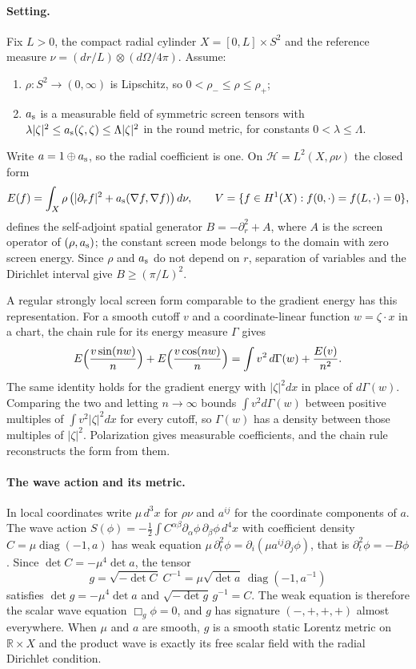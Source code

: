 \documentclass[11pt]{article}
\begin{document}
\paragraph{Setting.}
Fix $L>0$, the compact radial cylinder $X=[0,L]\times S^2$ and the reference
measure $\nu=(dr/L)\otimes(d\Omega/4\pi)$. Assume:
\begin{enumerate}\setlength{\itemsep}{1pt}
\item[(S1)] $\rho:S^2\to(0,\infty)$ is Lipschitz, so
  $0<\rho_-\leq\rho\leq\rho_+$;
\item[(S2)] $a_{\rm s}$ is a measurable field of symmetric screen tensors with
  $\lambda|\zeta|^2\leq a_{\rm s}(\zeta,\zeta)\leq\Lambda|\zeta|^2$ in the
  round metric, for constants $0<\lambda\leq\Lambda$.
\end{enumerate}
Write $a=1\oplus a_{\rm s}$, so the radial coefficient is one. On
$\mathcal H=L^2(X,\rho\nu)$ the closed form
\[
 E(f)=\int_X\rho\,\bigl(|\partial_rf|^2+a_{\rm s}(\nabla f,\nabla f)\bigr)\,d\nu,
 \qquad
 V=\{f\in H^1(X):f(0,\cdot)=f(L,\cdot)=0\},
\]
defines the self-adjoint spatial generator $B=-\partial_r^2+A$, where $A$ is
the screen operator of $(\rho,a_{\rm s})$; the constant screen mode belongs
to the domain with zero screen energy. Since $\rho$ and $a_{\rm s}$ do not
depend on $r$, separation of variables and the Dirichlet interval give
$B\geq(\pi/L)^2$.

A regular strongly local screen form comparable to the gradient energy has
this representation. For a smooth cutoff $v$ and a coordinate-linear
function $w=\zeta\cdot x$ in a chart, the chain rule for its energy measure
$\Gamma$ gives
\[
 E\Bigl(\frac{v\sin(nw)}{n}\Bigr)+E\Bigl(\frac{v\cos(nw)}{n}\Bigr)
 =\int v^2\,d\Gamma(w)+\frac{E(v)}{n^2}.
\]
The same identity holds for the gradient energy with $|\zeta|^2dx$ in place
of $d\Gamma(w)$. Comparing the two and letting $n\to\infty$ bounds
$\int v^2d\Gamma(w)$ between positive multiples of $\int v^2|\zeta|^2dx$ for
every cutoff, so $\Gamma(w)$ has a density between those multiples of
$|\zeta|^2$. Polarization gives measurable coefficients, and the chain rule
reconstructs the form from them.

\paragraph{The wave action and its metric.}
In local coordinates write $\mu\,d^3x$ for $\rho\nu$ and $a^{ij}$ for the
coordinate components of $a$. The wave action
$S(\phi)=-\tfrac12\int C^{\alpha\beta}\partial_\alpha\phi\,\partial_\beta\phi\,d^4x$
with coefficient density $C=\mu\operatorname{diag}(-1,a)$ has weak equation
$\mu\,\partial_t^2\phi=\partial_i(\mu a^{ij}\partial_j\phi)$, that is
$\partial_t^2\phi=-B\phi$. Since $\det C=-\mu^4\det a$, the tensor
\[
 g=\sqrt{-\det C}\;C^{-1}=\mu\sqrt{\det a}\,\operatorname{diag}(-1,a^{-1})
\]
satisfies $\det g=-\mu^4\det a$ and $\sqrt{-\det g}\,g^{-1}=C$. The weak
equation is therefore the scalar wave equation $\Box_g\phi=0$, and $g$ has
signature $(-,+,+,+)$ almost everywhere. When $\mu$ and $a$ are smooth, $g$
is a smooth static Lorentz metric on $\mathbb R\times X$ and the product
wave is exactly its free scalar field with the radial Dirichlet condition.
\end{document}
